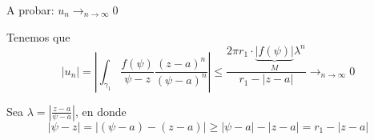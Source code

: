 \begin{teorema}[Laurent]
\begin{dem}
        A probar: $u_n\to_{n\to\infty}0$

        Tenemos que 
        $$|u_n|=\left|\int_{\gamma_1}\frac{f(\psi)}{\psi -z}\frac{(z-a)^n}{(\psi-a)^n}\right|\leq \frac{2\pi r_1\cdot \underbrace{|f(\psi)|}_{M}\lambda^n}{r_1-|z-a|}\to_{n\to \infty}0$$

        \begin{cajita}
            Sea $\lambda =\left|\frac{z-a}{\psi-a}\right|$, 
            en donde 
            $$|\psi -z| = |(\psi-a)-(z-a)|\geq |\psi-a|-|z-a|=r_1-|z-a|$$
        \end{cajita}
    \end{dem}
\end{teorema}

